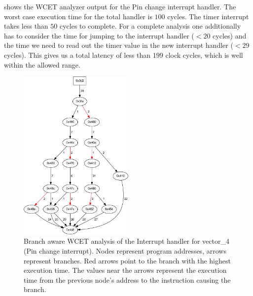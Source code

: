 \documentclass[a4paper]{scrreprt}
\begin{document}
shows the WCET analyzer output for the Pin change interrupt handler. The worst case execution time for the total
handler is $100$ cycles. The timer interrupt takes less than $50$ cycles to complete. For a complete analysis one
additionally has to consider the time for jumping to the interrupt handler ($<20$ cycles) and the time we need to read out the
timer value in the new interrupt handler ($<29$ cycles). This gives us a total latency of less than $199$ clock
cycles, which is well within the allowed range.
\begin{figure}
	\centering
	\includegraphics[width=0.5\textwidth]{img/wcet/vector_4.pdf}
  \caption{Branch aware WCET analysis of the Interrupt handler for vector\_4 (Pin change interrupt).
  Nodes represent program addresses, arrows represent branches. Red arrows point to the branch with the
highest execution time. The values near the arrows represent the execution time from the previous node's
address to the instruction causing the branch.}
	\label{fig:wcet}
\end{figure}
\end{document}
